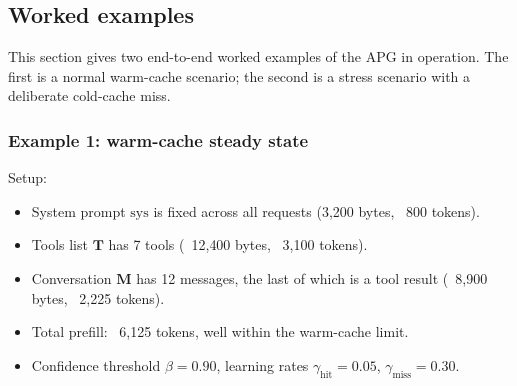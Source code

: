 \subsection{Worked examples}
\label{app:apg:worked}

This section gives two end-to-end worked examples of the APG in
operation. The first is a normal warm-cache scenario; the second
is a stress scenario with a deliberate cold-cache miss.

\subsubsection{Example 1: warm-cache steady state}

Setup:
\begin{itemize}
  \item System prompt $\mathrm{sys}$ is fixed across all requests
        (3{,}200 bytes, ~800 tokens).
  \item Tools list $\mathbf{T}$ has 7 tools (~12{,}400 bytes, ~3{,}100 tokens).
  \item Conversation $\mathbf{M}$ has 12 messages, the last of
        which is a tool result (~8{,}900 bytes, ~2{,}225 tokens).
  \item Total prefill: ~6{,}125 tokens, well within the
        warm-cache limit.
  \item Confidence threshold $\beta = 0.90$, learning rates
        $\gamma_{\text{hit}} = 0.05$, $\gamma_{\text{miss}} = 0.30$.
\end{itemize}

